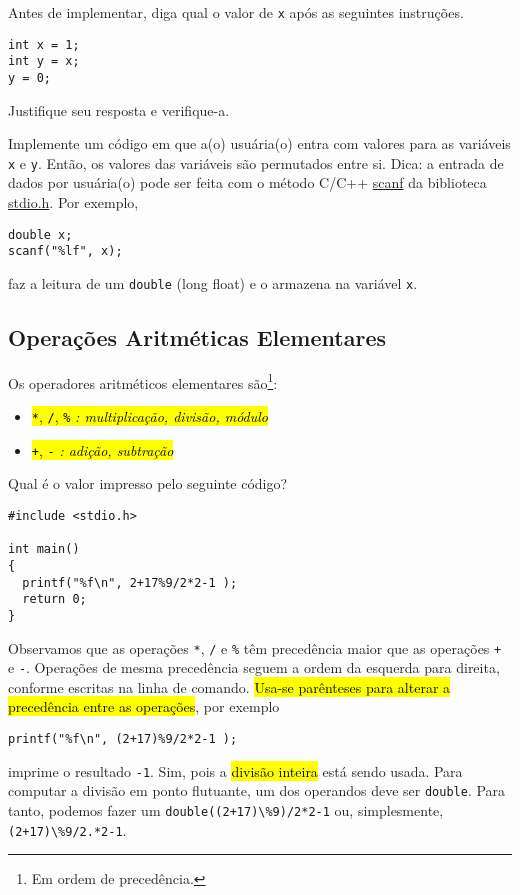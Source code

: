 \documentclass[12pt]{article}
\begin{document}
\begin{exr}
  Antes de implementar, diga qual o valor de \lstinline+x+ após as seguintes instruções.
\begin{lstlisting}
int x = 1;
int y = x;
y = 0;
\end{lstlisting}
  Justifique seu resposta e verifique-a.
\end{exr}

\begin{exr}
  Implemente um código em que a(o) usuária(o) entra com valores para as variáveis \lstinline+x+ e \lstinline+y+. Então, os valores das variáveis são permutados entre si. Dica: a entrada de dados por usuária(o) pode ser feita com o método C/C++ \href{https://cplusplus.com/reference/cstdio/scanf}{scanf} da biblioteca \href{https://cplusplus.com/reference/cstdio}{stdio.h}. Por exemplo,
\begin{lstlisting}
double x;
scanf("%lf", x);
\end{lstlisting}
faz a leitura de um \lstinline+double+ (long float) e o armazena na variável \lstinline+x+.
\end{exr}

\subsection{Operações Aritméticas Elementares}

Os operadores aritméticos elementares são\footnote{Em ordem de precedência.}:
\begin{itemize}
\item[]\hl{{\lstinline!*!}, {\lstinline!/!}, {\texttt{\%}} \emph{: multiplicação, divisão, módulo}}
\item[]\hl{{\lstinline!+!}, {\lstinline!-!} \emph{: adição, subtração}}
\end{itemize}

\begin{ex}
  Qual é o valor impresso pelo seguinte código?
\begin{lstlisting}
#include <stdio.h>

int main()
{
  printf("%f\n", 2+17%9/2*2-1 );
  return 0;
}
\end{lstlisting}

  Observamos que as operações {\lstinline+*+}, {\lstinline+/+} e {\texttt{\%}} têm precedência maior que as operações {\lstinline!+!} e {\lstinline!-!}. Operações de mesma precedência seguem a ordem da esquerda para direita, conforme escritas na linha de comando. \hl{Usa-se parênteses para alterar a precedência entre as operações}, por exemplo
\begin{lstlisting}
printf("%f\n", (2+17)%9/2*2-1 );
\end{lstlisting}
imprime o resultado \lstinline!-1!. Sim, pois a \hl{divisão inteira} está sendo usada. Para computar a divisão em ponto flutuante, um dos operandos deve ser \lstinline!double!. Para tanto, podemos fazer um  \lstinline!double((2+17)\%9)/2*2-1! ou, simplesmente, \lstinline!(2+17)\%9/2.*2-1!.
\end{ex}
\end{document}
